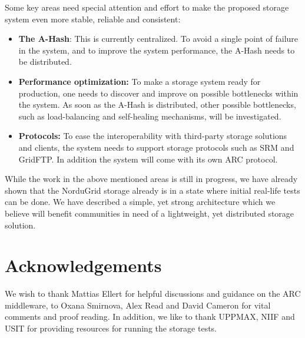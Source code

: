 \documentclass{llncs}
\begin{document}
Some key areas need special attention and effort to make the proposed
storage system even more stable, reliable and consistent:
\begin{itemize}
\item \textbf{The A-Hash}: This is currently centralized. To avoid a single
  point of failure in the system, and to improve the system
  performance, the A-Hash needs to be distributed.
\item \textbf{Performance optimization:} To make a storage system
  ready for production, one needs to discover and improve on
  possible bottlenecks within the system. As soon as the A-Hash is
  distributed, other possible bottlenecks, such as load-balancing
  and self-healing mechanisms, will be investigated.
\item \textbf{Protocols:} To ease the interoperability with third-party
  storage solutions and clients, the system needs to support storage
  protocols such as SRM and GridFTP. In addition the system will come
  with its own ARC protocol.
\end{itemize}

While the work in the above mentioned areas is still in progress, we have 
already shown that the NorduGrid storage already is in a state where initial 
real-life tests can be done. We have described a simple, yet strong 
architecture which we believe will benefit communities in need of a lightweight, 
yet distributed storage solution.

\section{Acknowledgements}
\label{Acknowledgements}

We wish to thank Mattias Ellert for helpful discussions and guidance
on the ARC middleware, to Oxana Smirnova, Alex Read and David Cameron 
for vital comments and proof reading. In addition, we like to thank UPPMAX, NIIF and USIT for
providing resources for running the storage tests.
\end{document}
